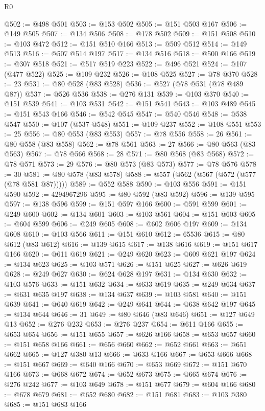 \begin{lexlean}{R0}
\begin{coremodule}
@502 := @498 @501
@503 := @153 @502
@505 := @151 @503 @167
@506 := @149 @505
@507 := @134 @506
@508 := @178 @502
@509 := @151 @508
@510 := @103 @472
@512 := @151 @510 @166
@513 := @509 @512
@514 := @149 @513
@516 := @507 @514 @197
@517 := @134 @516
@518 := @500 @166
@519 := @307 @518
@521 := @517 @519 @223
@522 := @496 @521
@524 := @107 (@477 @522)
@525 := @109 @232
@526 := @108 @525
@527 := @78 @370
@528 := 23
@531 := @80 @528 (@83 @528)
@536 := @527 (@78 @531 (@78 @489 @87))
@537 := @526 @536
@538 := @276 @131
@539 := @103 @370
@540 := @151 @539
@541 := @103 @531
@542 := @151 @541
@543 := @103 @489
@545 := @151 @543 @166
@546 := @542 @545
@547 := @540 @546
@548 := @538 @547
@550 := @107 (@537 @548)
@551 := @109 @237
@552 := @108 @551
@553 := 25
@556 := @80 @553 (@83 @553)
@557 := @78 @556
@558 := 26
@561 := @80 @558 (@83 @558)
@562 := @78 @561
@563 := 27
@566 := @80 @563 (@83 @563)
@567 := @78 @566
@568 := 28
@571 := @80 @568 (@83 @568)
@572 := @78 @571
@573 := 29
@576 := @80 @573 (@83 @573)
@577 := @78 @576
@578 := 30
@581 := @80 @578 (@83 @578)
@588 := @557 (@562 (@567 (@572 (@577 (@78 @581 @87)))))
@589 := @552 @588
@590 := @103 @556
@591 := @151 @590
@592 := 4294967296
@595 := @80 @592 (@83 @592)
@596 := @139 @595
@597 := @138 @596
@599 := @151 @597 @166
@600 := @591 @599
@601 := @249 @600
@602 := @134 @601
@603 := @103 @561
@604 := @151 @603
@605 := @604 @599
@606 := @249 @605
@608 := @602 @606 @197
@609 := @134 @608
@610 := @103 @566
@611 := @151 @610
@612 := 65536
@615 := @80 @612 (@83 @612)
@616 := @139 @615
@617 := @138 @616
@619 := @151 @617 @166
@620 := @611 @619
@621 := @249 @620
@623 := @609 @621 @197
@624 := @134 @623
@625 := @103 @571
@626 := @151 @625
@627 := @626 @619
@628 := @249 @627
@630 := @624 @628 @197
@631 := @134 @630
@632 := @103 @576
@633 := @151 @632
@634 := @633 @619
@635 := @249 @634
@637 := @631 @635 @197
@638 := @134 @637
@639 := @103 @581
@640 := @151 @639
@641 := @640 @619
@642 := @249 @641
@644 := @638 @642 @197
@645 := @134 @644
@646 := 31
@649 := @80 @646 (@83 @646)
@651 := @127 @649 @13
@652 := @276 @232
@653 := @276 @237
@654 := @611 @166
@655 := @653 @654
@656 := @151 @655
@657 := @626 @166
@658 := @653 @657
@660 := @151 @658 @166
@661 := @656 @660
@662 := @652 @661
@663 := @651 @662
@665 := @127 @380 @13
@666 := @633 @166
@667 := @653 @666
@668 := @151 @667
@669 := @640 @166
@670 := @653 @669
@672 := @151 @670 @166
@673 := @668 @672
@674 := @652 @673
@675 := @665 @674
@676 := @276 @242
@677 := @103 @649
@678 := @151 @677
@679 := @604 @166
@680 := @678 @679
@681 := @652 @680
@682 := @151 @681
@683 := @103 @380
@685 := @151 @683 @166

\end{coremodule}
\end{lexlean}
